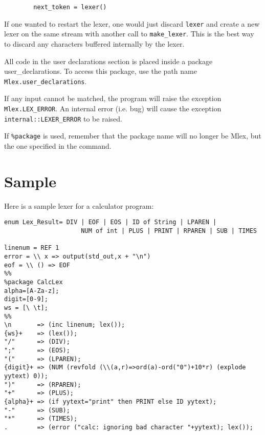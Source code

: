 \begin{verbatim}
        next_token = lexer()
\end{verbatim}

If one wanted to restart the lexer, one would just discard {\tt lexer}
and create a new lexer on the same stream with another call to
{\tt make_lexer}.  This is the best way to discard any characters buffered
internally by the lexer.

All code in the user declarations section is placed inside a
package user_declarations.  To access this package, use the path name
{\tt Mlex.user_declarations}.

If any input cannot be matched, the program will raise the exception
{\tt Mlex.LEX_ERROR}.  An internal error (i.e.  bug) will cause the
exception {\tt internal::LEXER_ERROR} to be raised.

If {\tt \%package} is used, remember that the package name will no
longer be Mlex, but the one specified in the command.

\section{Sample}

Here is a sample lexer for a calculator program:

\small
\begin{verbatim}
enum Lex_Result= DIV | EOF | EOS | ID of String | LPAREN |
                     NUM of int | PLUS | PRINT | RPAREN | SUB | TIMES 

linenum = REF 1
error = \\ x => output(std_out,x + "\n")
eof = \\ () => EOF
%%
%package CalcLex
alpha=[A-Za-z];
digit=[0-9];
ws = [\ \t];
%%
\n       => (inc linenum; lex());
{ws}+    => (lex());
"/"      => (DIV);
";"      => (EOS);
"("      => (LPAREN);
{digit}+ => (NUM (revfold (\\(a,r)=>ord(a)-ord("0")+10*r) (explode yytext) 0));
")"      => (RPAREN);
"+"      => (PLUS);
{alpha}+ => (if yytext="print" then PRINT else ID yytext);
"-"      => (SUB);
"*"      => (TIMES);
.        => (error ("calc: ignoring bad character "+yytext); lex());
\end{verbatim}


